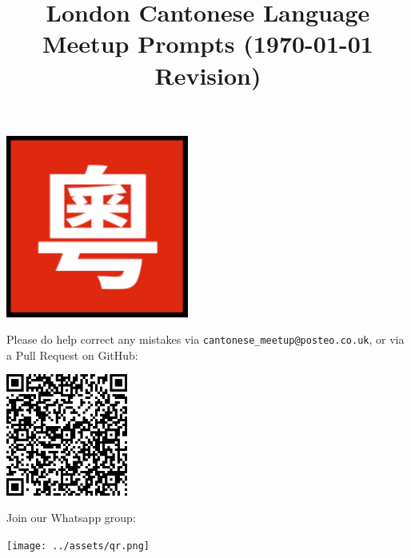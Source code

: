 \title{\vspace{-0.5cm}\large\bfseries London Cantonese Language Meetup Prompts (\today{} Revision)}
\author{}
\date{}
\maketitle

\vspace{-2cm}

\begin{center}
  \includegraphics[width=0.45\textwidth]{../assets/logo.png}
\end{center}

Please do help correct any mistakes via \texttt{cantonese\_meetup@posteo.co.uk}, or via a Pull Request on GitHub:

\begin{center}
  \includegraphics[width=0.30\textwidth]{../assets/github.png}
\end{center}

Join our Whatsapp group:

\begin{center}
  \texttt{[image: ../assets/qr.png]}
\end{center}

